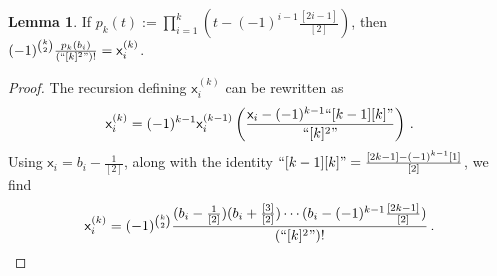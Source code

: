 \documentclass[10pt]{amsart}
\numberwithin{equation}{section}
\theoremstyle{definition}
\newtheorem{lem}[thm]{Lemma}
\newcommand{\xxb}{\mathsf{x}}
\begin{document}
\begin{lem}\label{lem:minpoly-vs-dividedpower}
If $p_k(t):= \prod_{i=1}^k (t -(-1)^{i-1}\frac{[2i-1]}{[2]})$, then 
$(-1)^{\binom{k}{2}}\frac{p_k(b_i)}{(``[k]^2")!} = \xxb_i^{(k)}$.
\end{lem}
\begin{proof}
The recursion defining $\xxb_i^{(k)}$ can be rewritten as
\[
\xxb_i^{(k)} = (-1)^{k-1}\xxb_i^{(k-1)} \left( \frac{\xxb_i - (-1)^{k-1} ``[k-1][k]" }{``[k]^2"} \right) \, .
\]
Using $\xxb_i = b_i - \frac{1}{[2]}$, 
along with the identity 
$``[k-1][k]" = \frac{[2k-1] - (-1)^{k-1}[1]}{[2]}$, 
we find
\[
\xxb_i^{(k)} = (-1)^{\binom{k}{2}}\frac{(b_i - \frac{1}{[2]})(b_i + \frac{[3]}{[2]}) 
	\cdots (b_i - (-1)^{k-1}\frac{[2k-1]}{[2]})}{(``[k]^2")!} \, . \qedhere
\]
\end{proof}
\end{document}
